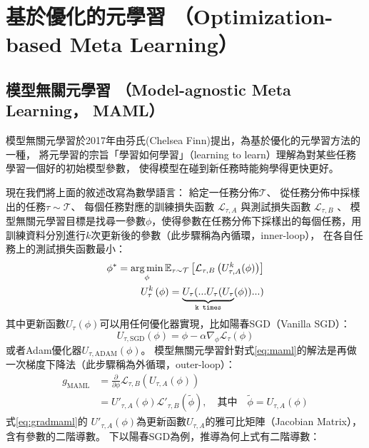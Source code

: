 \section{基於優化的元學習 （Optimization-based Meta Learning）}
\label{sec:mamls}
\subsection{模型無關元學習 （Model-agnostic Meta Learning， MAML）}
模型無關元學習於2017年由芬氏(Chelsea Finn)提出，為基於優化的元學習方法的一種，
將元學習的宗旨「學習如何學習」（learning to learn）理解為對某些任務學習一個好的初始模型參數，
使得模型在碰到新任務時能夠學得更快更好。

現在我們將上面的敘述改寫為數學語言：
給定一任務分佈$\mathcal{T}$、
從任務分佈中採樣出的任務$\tau \sim \mathcal{T}$、
每個任務對應的訓練損失函數 $\mathcal{L}_{\tau,A}$ 與測試損失函數 $\mathcal{L}_{\tau,B}$ 、
模型無關元學習目標是找尋一參數$\phi$，使得參數在任務分佈下採樣出的每個任務，用訓練資料分別進行$k$次更新後的參數（此步驟稱為內循環，inner-loop），
在各自任務上的測試損失函數最小：
\begin{align}
    \phi^{\ast} = \operatorname*{arg\,min}_{\phi} \mathbb{E}_{\tau \sim \mathcal{T}} \left[ \mathcal{L}_{\tau,B} \left( U_{\tau,A}^{k} (\phi) \right) \right] \label{eq:maml}\\
    U_{\tau}^{k} \left( \phi \right) = \underbrace{U_{\tau} ( ... U_{\tau} ( U_{\tau} }_{\texttt{k times}} ( \phi ) ) ... )
\end{align}
其中更新函數$U_{\tau}(\phi)$可以用任何優化器實現，比如陽春SGD（Vanilla SGD）：
\begin{equation}
U_{\tau, \textrm{SGD}} \left( \phi \right) = \phi - \alpha \nabla_{\phi} \mathcal{L}_{\tau} \left( \phi \right)
\end{equation}
或者Adam優化器$U_{\tau,\textrm{ADAM}}(\phi)$\cite{kingma2014adam}。
模型無關元學習針對式\ref{eq:maml}的解法是再做一次梯度下降法（此步驟稱為外循環，outer-loop）：
\begin{align}
    g_{\mathrm{MAML}} &= \frac{\partial }{\partial \phi} \mathcal{L}_{\tau, B} \left( U_{\tau, A} (\phi) \right) \\
                      &= U'_{\tau, A} (\phi) \mathcal{L'}_{\tau, B} ( \widetilde{\phi} ),\quad \text{其中}\quad \widetilde{\phi} = U_{\tau, A} (\phi) \label{eq:gradmaml}
\end{align}
式\ref{eq:gradmaml}的 $U'_{\tau, A} (\phi)$為更新函數$U_{\tau, A}$的雅可比矩陣（Jacobian Matrix），含有參數的二階導數。
下以陽春SGD為例，推導為何上式有二階導數：

